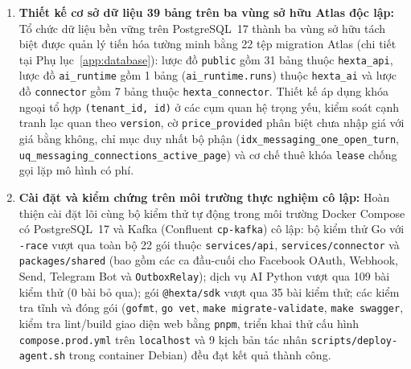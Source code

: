 \begin{enumerate}
  \item \textbf{Thiết kế cơ sở dữ liệu 39 bảng trên ba vùng sở hữu Atlas độc lập:} Tổ chức dữ liệu bền vững trên PostgreSQL~17 thành ba vùng sở hữu tách biệt được quản lý tiến hóa tường minh bằng 22 tệp migration Atlas (chi tiết tại Phụ lục~\ref{app:database}): lược đồ \texttt{public} gồm 31 bảng thuộc \texttt{hexta\_\hspace{0pt}api}, lược đồ \texttt{ai\_\hspace{0pt}runtime} gồm 1 bảng (\texttt{ai\_\hspace{0pt}runtime.\hspace{0pt}runs}) thuộc \texttt{hexta\_\hspace{0pt}ai} và lược đồ \texttt{connector} gồm 7 bảng thuộc \texttt{hexta\_\hspace{0pt}connector}. Thiết kế áp dụng khóa ngoại tổ hợp \texttt{(tenant\_id, id)} ở các cụm quan hệ trọng yếu, kiểm soát cạnh tranh lạc quan theo \texttt{version}, cờ \texttt{price\_\hspace{0pt}provided} phân biệt chưa nhập giá với giá bằng không, chỉ mục duy nhất bộ phận (\texttt{idx\_\hspace{0pt}messaging\_\hspace{0pt}one\_\hspace{0pt}open\_\hspace{0pt}turn}, \texttt{uq\_\hspace{0pt}messaging\_\hspace{0pt}connections\_\hspace{0pt}active\_\hspace{0pt}page}) và cơ chế thuê khóa \texttt{lease} chống gọi lặp mô hình có phí.
  \item \textbf{Cài đặt và kiểm chứng trên môi trường thực nghiệm cô lập:} Hoàn thiện cài đặt lõi cùng bộ kiểm thử tự động trong môi trường Docker Compose có PostgreSQL~17 và Kafka (Confluent \texttt{cp-\hspace{0pt}kafka}) cô lập: bộ kiểm thử Go với \texttt{-race} vượt qua toàn bộ 22 gói thuộc \texttt{services/\hspace{0pt}api}, \texttt{services/\hspace{0pt}connector} và \texttt{packages/\hspace{0pt}shared} (bao gồm các ca đầu-cuối cho Facebook OAuth, Webhook, Send, Telegram Bot và \texttt{Outbox\hspace{0pt}Relay}); dịch vụ AI Python vượt qua 109 bài kiểm thử (0 bài bỏ qua); gói \texttt{@hexta/\hspace{0pt}sdk} vượt qua 35 bài kiểm thử; các kiểm tra tĩnh và đóng gói (\texttt{gofmt}, \texttt{go vet}, \texttt{make migrate-\hspace{0pt}validate}, \texttt{make swagger}, kiểm tra lint/build giao diện web bằng \texttt{pnpm}, triển khai thử cấu hình \texttt{compose.\hspace{0pt}prod.\hspace{0pt}yml} trên \texttt{localhost} và 9 kịch bản tác nhân \texttt{scripts/\hspace{0pt}deploy-\hspace{0pt}agent.\hspace{0pt}sh} trong container Debian) đều đạt kết quả thành công.

\end{enumerate}
